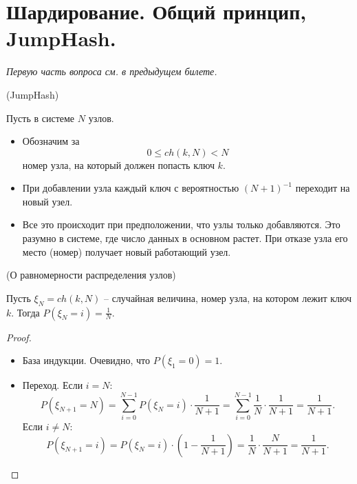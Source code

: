 \section{Шардирование. Общий принцип, JumpHash.}

\textit{Первую часть вопроса см. в предыдущем билете.}

\begin{algorithm}(JumpHash)
    
    Пусть в системе $N$ узлов.
    \begin{itemize}
        \item Обозначим за
            \[
                0 \leqslant ch(k, N) < N
            \]
            номер узла, на который должен попасть ключ $k$.
        \item При добавлении узла каждый ключ с вероятностью $(N + 1)^{-1}$
            переходит на новый узел.
        \item Все это происходит при предположении, что узлы только добавляются.
            Это разумно в системе, где число данных в основном растет. При отказе
            узла его место (номер) получает новый работающий узел.
    \end{itemize}
\end{algorithm}

\begin{lemma}(О равномерности распределения узлов)

    Пусть $\xi_N = ch(k, N)$ -- случайная величина, номер узла, на котором
    лежит ключ $k$. Тогда $P(\xi_N = i) = \frac{1}{N}$.
\end{lemma}
\begin{proof}
    \enewline
    \begin{itemize}
        \item База индукции. Очевидно, что $P(\xi_1 = 0) = 1$.
        \item Переход. Если $i = N$:
            \[
                P(\xi_{N + 1} = N) = \sum_{i = 0}^{N - 1}{P(\xi_N = i) \cdot 
                \frac{1}{N + 1}} = \sum_{i = 0}^{N - 1}{\frac{1}{N} \cdot 
                \frac{1}{N + 1}} = \frac{1}{N + 1}
            .\]
            Если $i \neq N$:
            \[
                P(\xi_{N + 1} = i) = P(\xi_N = i) \cdot \left(1 - \frac{1}{N + 1}\right)
                = \frac{1}{N} \cdot \frac{N}{N + 1} = \frac{1}{N + 1}
            .\]
    \end{itemize}
\end{proof}


